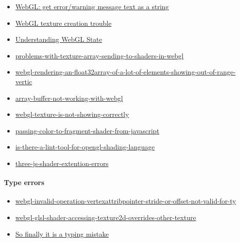 \documentclass[]{article}
\begin{document}
\begin{itemize}
\itemsep1pt\parskip0pt
\item
  \href{http://stackoverflow.com/questions/26400009/webgl-get-error-warning-message-text-as-a-string}{WebGL:
  get error/warning message text as a string}
\item
  \href{http://stackoverflow.com/questions/22666556/webgl-texture-creation-trouble}{WebGL
  texture creation trouble}
\item
  \href{http://stackoverflow.com/questions/28604747/understanding-webgl-state}{Understanding
  WebGL State}
\item
  \href{http://stackoverflow.com/questions/19829244/problems-with-texture-array-sending-to-shaders-in-webgl}{problems-with-texture-array-sending-to-shaders-in-webgl}
\item
  \href{http://stackoverflow.com/questions/31433319/webgl-rendering-an-float32array-of-a-lot-of-elements-showing-out-of-range-vertic}{webgl-rendering-an-float32array-of-a-lot-of-elements-showing-out-of-range-vertic}
\item
  \href{http://stackoverflow.com/questions/21537721/array-buffer-not-working-with-webgl}{array-buffer-not-working-with-webgl}
\item
  \href{http://stackoverflow.com/questions/27524490/webgl-texture-is-not-showing-correctly/27525037\#27525037}{webgl-texture-is-not-showing-correctly}
\item
  \href{http://stackoverflow.com/questions/26134077/passing-color-to-fragment-shader-from-javascript}{passing-color-to-fragment-shader-from-javascript}
\item
  \href{http://stackoverflow.com/questions/4009914/is-there-a-lint-tool-for-opengl-shading-language/4017112\#4017112}{is-there-a-lint-tool-for-opengl-shading-language}
\item
  \href{http://stackoverflow.com/questions/17035588/three-js-shader-extention-errors}{three-js-shader-extention-errors}
\end{itemize}

\paragraph{Type errors}\label{type-errors}

\begin{itemize}
\itemsep1pt\parskip0pt
\item
  \href{http://stackoverflow.com/questions/28747458/webgl-invalid-operation-vertexattribpointer-stride-or-offset-not-valid-for-ty}{webgl-invalid-operation-vertexattribpointer-stride-or-offset-not-valid-for-ty}
\item
  \href{http://stackoverflow.com/questions/10590819/webgl-glsl-shader-accessing-texture2d-overrides-other-texture/10592100\#10592100}{webgl-glsl-shader-accessing-texture2d-overrides-other-texture}
\item
  \href{http://stackoverflow.com/questions/31429591/webgl-code-not-working}{So
  finally it is a typing mistake}
\end{itemize}
\end{document}
